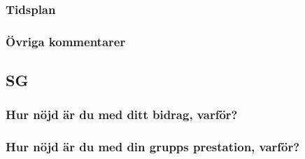 \documentclass[a4paper]{article}
\begin{document}
\subsubsection{Tidsplan}
\subsubsection{Övriga kommentarer}

\subsection{SG}
\subsubsection{Hur nöjd är du med ditt bidrag, varför?}




\subsubsection{Hur nöjd är du med din grupps prestation, varför?}
\end{document}
